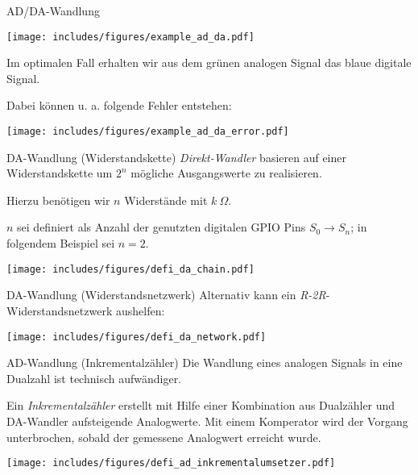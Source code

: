 \begin{example}{AD/DA-Wandlung}
    \begin{center}
        \texttt{[image: includes/figures/example\_ad\_da.pdf]}
    \end{center}

    Im optimalen Fall erhalten wir aus dem grünen analogen Signal das blaue digitale Signal.

    Dabei können u. a. folgende Fehler entstehen:

    \texttt{[image: includes/figures/example\_ad\_da\_error.pdf]}
\end{example}

\begin{defi}{DA-Wandlung (Widerstandskette)}
    \emph{Direkt-Wandler} basieren auf einer Widerstandskette um $2^n$ mögliche Ausgangswerte zu realisieren.

    Hierzu benötigen wir $n$ Widerstände mit $k \ \Omega$.

    $n$ sei definiert als Anzahl der genutzten digitalen GPIO Pins $S_0 \to S_n$; in folgendem Beispiel sei $n = 2$.

    \begin{center}
        \texttt{[image: includes/figures/defi\_da\_chain.pdf]}
    \end{center}
\end{defi}

\begin{defi}{DA-Wandlung (Widerstandsnetzwerk)}
    Alternativ kann ein \emph{R-2R}-Widerstandsnetzwerk aushelfen:

    \begin{center}
        \texttt{[image: includes/figures/defi\_da\_network.pdf]}
    \end{center}
\end{defi}

\begin{defi}{AD-Wandlung (Inkrementalzähler)}
    Die Wandlung eines analogen Signals in eine Dualzahl ist technisch aufwändiger.

    Ein \emph{Inkrementalzähler} erstellt mit Hilfe einer Kombination aus Dualzähler und DA-Wandler aufsteigende Analogwerte.
    Mit einem Komperator wird der Vorgang unterbrochen, sobald der gemessene Analogwert erreicht wurde.

    \begin{center}
        \texttt{[image: includes/figures/defi\_ad\_inkrementalumsetzer.pdf]}
    \end{center}
\end{defi}

